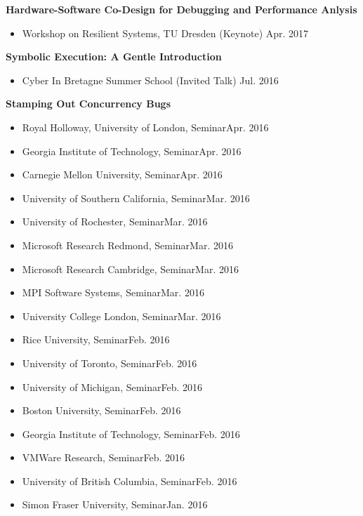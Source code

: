 \documentclass[10pt]{article}
\newcommand{\mysub}[3]{\textbf{#1} {#2} \hfill {\em #3}}
\begin{document}
\mysub{Hardware-Software Co-Design for Debugging and Performance Anlysis}{}{}
\vspace{-2mm}
\begin{itemize}
  \setlength\itemsep{0em}
  \item{Workshop on Resilient Systems, TU Dresden (Keynote)} \hfill Apr. 2017
\end{itemize}
\mysub{Symbolic Execution: A Gentle Introduction}{}{}
\vspace{-2mm}
\begin{itemize}
  \setlength\itemsep{0em}
  \item{Cyber In Bretagne Summer School (Invited Talk)} \hfill Jul. 2016
\end{itemize}

\mysub{Stamping Out Concurrency Bugs}{}{} 
\vspace{-2mm}
\begin{itemize}
\setlength\itemsep{0em}
\item{Royal Holloway, University of London, Seminar}\hfill Apr. 2016
\item{Georgia Institute of Technology, Seminar}\hfill Apr. 2016
\item{Carnegie Mellon University, Seminar}\hfill Apr. 2016
\item{University of Southern California, Seminar}\hfill Mar. 2016
\item{University of Rochester, Seminar}\hfill Mar. 2016
\item{Microsoft Research Redmond, Seminar}\hfill Mar. 2016
\item{Microsoft Research Cambridge, Seminar}\hfill Mar. 2016
\item{MPI Software Systems, Seminar}\hfill Mar. 2016
\item{University College London, Seminar}\hfill Mar. 2016
\item{Rice University, Seminar}\hfill Feb. 2016
\item{University of Toronto, Seminar}\hfill Feb. 2016
\item{University of Michigan, Seminar}\hfill Feb. 2016
\item{Boston University, Seminar}\hfill Feb. 2016
\item{Georgia Institute of Technology, Seminar}\hfill Feb. 2016
\item{VMWare Research, Seminar}\hfill Feb. 2016
\item{University of British Columbia, Seminar}\hfill Feb. 2016
\item{Simon Fraser University, Seminar}\hfill Jan. 2016
\end{itemize}
\end{document}
